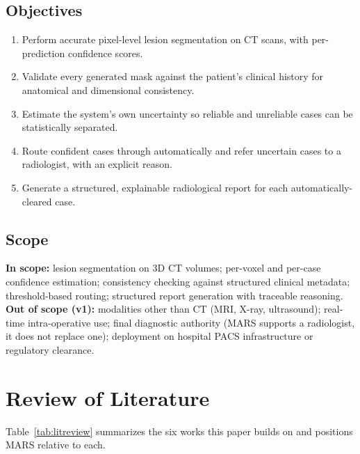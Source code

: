\documentclass[11pt,a4paper]{article}
\begin{document}
\subsection{Objectives}
\begin{enumerate}[leftmargin=1.4em]
    \item Perform accurate pixel-level lesion segmentation on CT scans, with per-prediction confidence scores.
    \item Validate every generated mask against the patient's clinical history for anatomical and dimensional consistency.
    \item Estimate the system's own uncertainty so reliable and unreliable cases can be statistically separated.
    \item Route confident cases through automatically and refer uncertain cases to a radiologist, with an explicit reason.
    \item Generate a structured, explainable radiological report for each automatically-cleared case.
\end{enumerate}

\subsection{Scope}
\textbf{In scope:} lesion segmentation on 3D CT volumes; per-voxel and per-case confidence estimation; consistency checking against structured clinical metadata; threshold-based routing; structured report generation with traceable reasoning.
\textbf{Out of scope (v1):} modalities other than CT (MRI, X-ray, ultrasound); real-time intra-operative use; final diagnostic authority (MARS supports a radiologist, it does not replace one); deployment on hospital PACS infrastructure or regulatory clearance.

\section{Review of Literature}
\label{sec:lit}

Table~\ref{tab:litreview} summarizes the six works this paper builds on and positions MARS relative to each.
\end{document}
